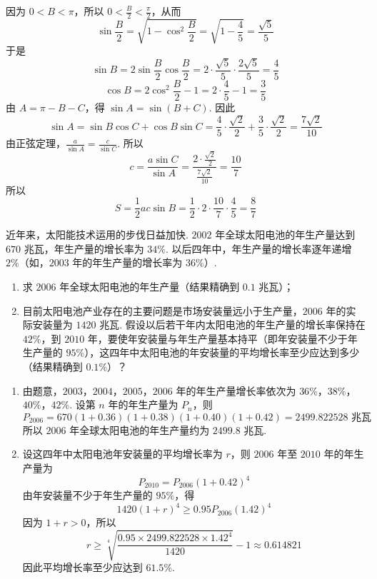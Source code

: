\begin{solution}
因为 \(0<B<\pi\)，所以 \(0<\frac{B}{2}<\frac{\pi}{2}\)，从而
\[
\sin\frac{B}{2}=\sqrt{1-\cos^2\frac{B}{2}}=\sqrt{1-\frac{4}{5}}=\frac{\sqrt{5}}{5}
\]
于是
\[
\sin B=2\sin\frac{B}{2}\cos\frac{B}{2}=2\cdot\frac{\sqrt{5}}{5}\cdot\frac{2\sqrt{5}}{5}=\frac{4}{5}
\]
\[
\cos B=2\cos^2\frac{B}{2}-1=2\cdot\frac{4}{5}-1=\frac{3}{5}
\]
由 \(A=\pi-B-C\)，得 \(\sin A=\sin(B+C)\). 因此
\[
\sin A=\sin B\cos C+\cos B\sin C
=\frac{4}{5}\cdot\frac{\sqrt{2}}{2}+\frac{3}{5}\cdot\frac{\sqrt{2}}{2}=\frac{7\sqrt{2}}{10}
\]
由正弦定理，\(\frac{a}{\sin A}=\frac{c}{\sin C}\). 所以
\[
c=\frac{a\sin C}{\sin A}=\frac{2\cdot\frac{\sqrt{2}}{2}}{\frac{7\sqrt{2}}{10}}=\frac{10}{7}
\]
所以
\[
S=\frac{1}{2}ac\sin B=\frac{1}{2}\cdot2\cdot\frac{10}{7}\cdot\frac{4}{5}=\frac{8}{7}
\]
\end{solution}

\begin{problem}
近年来，太阳能技术运用的步伐日益加快. \(2002\) 年全球太阳电池的年生产量达到 \(670\text{ 兆瓦}\)，年生产量的增长率为 \(34\%\). 以后四年中，年生产量的增长率逐年递增 \(2\%\)（如，\(2003\) 年的年生产量的增长率为 \(36\%\)）.

\begin{enumerate}
\item 求 \(2006\) 年全球太阳电池的年生产量（结果精确到 \(0.1\text{ 兆瓦}\)）；
\item 目前太阳电池产业存在的主要问题是市场安装量远小于生产量，\(2006\) 年的实际安装量为 \(1420\text{ 兆瓦}\). 假设以后若干年内太阳电池的年生产量的增长率保持在 \(42\%\)，到 \(2010\) 年，要使年安装量与年生产量基本持平（即年安装量不少于年生产量的 \(95\%\)），这四年中太阳电池的年安装量的平均增长率至少应达到多少（结果精确到 \(0.1\%\)）？
\end{enumerate}
\end{problem}

\begin{solution}
\begin{enumerate}
\item 由题意，\(2003\)，\(2004\)，\(2005\)，\(2006\) 年的年生产量增长率依次为 \(36\%\)，\(38\%\)，\(40\%\)，\(42\%\). 设第 \(n\) 年的年生产量为 \(P_n\)，则
\[
P_{2006}=670(1+0.36)(1+0.38)(1+0.40)(1+0.42)=2499.822528\text{ 兆瓦}
\]
所以 \(2006\) 年全球太阳电池的年生产量约为 \(2499.8\text{ 兆瓦}\).

\item 设这四年中太阳电池年安装量的平均增长率为 \(r\)，则 \(2006\) 年至 \(2010\) 年的年生产量为
\[
P_{2010}=P_{2006}(1+0.42)^4
\]
由年安装量不少于年生产量的 \(95\%\)，得
\[
1420(1+r)^4\geqslant0.95P_{2006}(1.42)^4
\]
因为 \(1+r>0\)，所以
\[
r\geqslant\sqrt[4]{\frac{0.95\times2499.822528\times1.42^4}{1420}}-1
\approx0.614821
\]
因此平均增长率至少应达到 \(61.5\%\).
\end{enumerate}
\end{solution}

